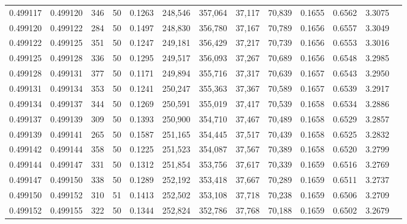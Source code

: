 \begin{tabular}{rrrrrrrrrrrrr}
0.499117 & 0.499120 & 346 &  50 &                                     0.1263 & 248,546 & 357,064 &  37,117 &  70,839 & 0.1655 & 0.6562 & 3.3075 \\
0.499120 & 0.499122 & 284 &  50 &                                     0.1497 & 248,830 & 356,780 &  37,167 &  70,789 & 0.1656 & 0.6557 & 3.3049 \\
0.499122 & 0.499125 & 351 &  50 &                                     0.1247 & 249,181 & 356,429 &  37,217 &  70,739 & 0.1656 & 0.6553 & 3.3016 \\
0.499125 & 0.499128 & 336 &  50 &                                     0.1295 & 249,517 & 356,093 &  37,267 &  70,689 & 0.1656 & 0.6548 & 3.2985 \\
0.499128 & 0.499131 & 377 &  50 &                                     0.1171 & 249,894 & 355,716 &  37,317 &  70,639 & 0.1657 & 0.6543 & 3.2950 \\
0.499131 & 0.499134 & 353 &  50 &                                     0.1241 & 250,247 & 355,363 &  37,367 &  70,589 & 0.1657 & 0.6539 & 3.2917 \\
0.499134 & 0.499137 & 344 &  50 &                                     0.1269 & 250,591 & 355,019 &  37,417 &  70,539 & 0.1658 & 0.6534 & 3.2886 \\
0.499137 & 0.499139 & 309 &  50 &                                     0.1393 & 250,900 & 354,710 &  37,467 &  70,489 & 0.1658 & 0.6529 & 3.2857 \\
0.499139 & 0.499141 & 265 &  50 &                                     0.1587 & 251,165 & 354,445 &  37,517 &  70,439 & 0.1658 & 0.6525 & 3.2832 \\
0.499142 & 0.499144 & 358 &  50 &                                     0.1225 & 251,523 & 354,087 &  37,567 &  70,389 & 0.1658 & 0.6520 & 3.2799 \\
0.499144 & 0.499147 & 331 &  50 &                                     0.1312 & 251,854 & 353,756 &  37,617 &  70,339 & 0.1659 & 0.6516 & 3.2769 \\
0.499147 & 0.499150 & 338 &  50 &                                     0.1289 & 252,192 & 353,418 &  37,667 &  70,289 & 0.1659 & 0.6511 & 3.2737 \\
0.499150 & 0.499152 & 310 &  51 &                                     0.1413 & 252,502 & 353,108 &  37,718 &  70,238 & 0.1659 & 0.6506 & 3.2709 \\
0.499152 & 0.499155 & 322 &  50 &                                     0.1344 & 252,824 & 352,786 &  37,768 &  70,188 & 0.1659 & 0.6502 & 3.2679 \\

\end{tabular}
